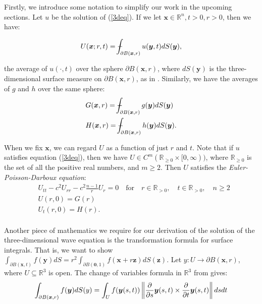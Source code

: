 \documentclass[a4paper, 12pt]{article}
\def\Xint#1{\mathchoice
{\XXint\displaystyle\textstyle{#1}}%
{\XXint\textstyle\scriptstyle{#1}}%
{\XXint\scriptstyle\scriptscriptstyle{#1}}%
{\XXint\scriptscriptstyle\scriptscriptstyle{#1}}%
\!\int}
\def\XXint#1#2#3{{\setbox0=\hbox{$#1{#2#3}{\int}$ }
\vcenter{\hbox{$#2#3$ }}\kern-.6\wd0}}
\def\dashint{\Xint-}
\numberwithin{equation}{section}
\begin{document}
Firstly, we introduce some notation to simplify our work in the upcoming
sections. Let $u$ be the solution of (\ref{3deq}). If we let $\boldsymbol{x}\in \mathbb{R}^n, t>0, r>0$, then we have:

\begin{equation} \label{averageU}
    U(\boldsymbol{x};r,t)=\dashint_{\partial B(\boldsymbol{x},r)}u(\boldsymbol{y},t)dS(\boldsymbol{y}),
\end{equation}

the average of $u(\cdot,t)$ over the sphere $\partial B(\boldsymbol{x},r)$, where
$dS(\boldsymbol{y})$ is the three-dimensional surface measure on $\partial B(\boldsymbol{x},r)$,
as in \cite[Ch. 2.4.1 b]{Ev}. Similarly, we have the averages of $g$ and $h$ over the same
sphere:
\begin{equation} \label{averageGH}
    \begin{aligned}
        &G(\boldsymbol{x},r)=\dashint_{\partial B(\boldsymbol{x},r)}g(\boldsymbol{y})dS(\boldsymbol{y})\\
        &H(\boldsymbol{x},r)=\dashint_{\partial B(\boldsymbol{x},r)}h(\boldsymbol{y})dS(\boldsymbol{y}).
    \end{aligned}
\end{equation}

When we fix $\boldsymbol{x}$, we can regard $U$ as a function of just $r$ and
$t$. Note that if $u$ satisfies equation (\ref{3deq}), then we have $U \in
C^m(\mathbb{R}_{\ge 0}\times[0,\infty))$, where $\mathbb{R}_{\ge 0}$ is the set
of all the positive real numbers, and $m \ge 2$. Then $U$ satisfies the \emph{Euler-Poisson-Darboux equation}:
\begin{equation} \label{EPDeq}
    \begin{aligned}
        &U_{tt}-c^2U_{rr}-c^2\frac{n-1}{r}U_r=0 \quad \textrm {for} \quad r \in \mathbb{R}_{>0}, \quad t \in \mathbb{R}_{>0}, \quad n \ge 2\\
        &U(r, 0)=G(r)\\
        &U_t(r,0)=H(r).
    \end{aligned}
\end{equation}
\\

Another piece of mathematics we require for our derivation of the solution of
the three-dimensional wave equation is the transformation formula for surface
integrals. That is, we want to show $\int_{\partial
B(\boldsymbol{x},t)}f(\boldsymbol{y})dS=r^2\int_{\partial B(\boldsymbol{0},1)}
f(\boldsymbol{x}+r\boldsymbol{z})dS(\boldsymbol{z})$. Let $y:U \rightarrow
\partial B(\boldsymbol{x}, r)$, where $U \subseteq \mathbb{R}^3$ is open. The change of variables
formula in $\mathbb{R}^3$ from \cite[Ch. 11, Th. 11.1]{LooSter} gives:
\begin{equation*}
    \int_{\partial B(\boldsymbol{x},r)}f(\boldsymbol{y})dS(y)=\int_U f(\boldsymbol{y}(s,t))\left\| \diffp[1]{}{s}\boldsymbol{y}(s, t) \times \diffp[1]{}{t}\boldsymbol{y}(s, t) \right \|ds dt
\end{equation*}
\end{document}
